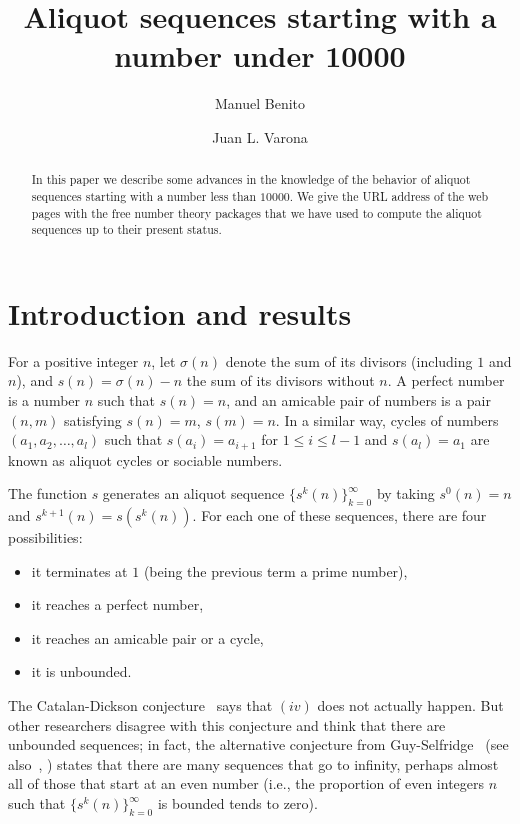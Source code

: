 \documentclass[11pt,twoside]{article}   %
\title{Aliquot sequences starting with a number under 10000}
\author{
Manuel Benito
\and 
Juan L. Varona
}
\date{}
\theoremstyle{plain}
\theoremstyle{definition}
\theoremstyle{remark}
\begin{document}
\maketitle 

\begin{abstract}
In this paper we describe some advances in the knowledge of the behavior of
aliquot sequences starting with a number less than $10000$. We give the URL address
of the web pages with the free number theory packages that we have used to compute the
aliquot sequences up to their present status.
\end{abstract}

\section*{Introduction and results}

For a positive integer $n$, let $\sigma(n)$ denote the sum of its divisors
(including $1$ and $n$), and $s(n) = \sigma(n) - n$
the sum of its divisors without $n$.
A perfect number is a number $n$ such that
$s(n) = n$, and an amicable pair of numbers is a pair $(n,m)$ satisfying
$s(n) = m$, $s(m) = n$. In a similar way, cycles of numbers
$(a_1, a_2, \dots, a_l)$ such that $s(a_i) = a_{i+1}$ for $1 \le i \le l-1$
and $s(a_l) = a_1$ are known as aliquot cycles or sociable numbers.

The function $s$ generates an aliquot sequence $\{s^k(n)\}_{k=0}^\infty$ 
by taking $s^0(n) = n$ and $s^{k+1}(n) = s(s^k(n))$. For each one of these sequences,
there are four possibilities:
\begin{itemize}
\setlength{\itemsep}{0pt}
\item[$(i)$] it terminates at $1$ (being the previous term a prime number),
\item[$(ii)$] it reaches a perfect number,
\item[$(iii)$] it reaches an amicable pair or a cycle,
\item[$(iv)$] it is unbounded.
\end{itemize}
The Catalan-Dickson conjecture~\cite{Cat,Dick} says that $(iv)$ does not actually happen.
But other researchers disagree with this conjecture and think that there
are unbounded sequences; in fact, the alternative conjecture from
Guy-Selfridge~\cite{Guy-Sel} (see also~\cite{Guy-Guy}, \cite{Guy}) states that
there are many sequences that go to infinity, perhaps almost all of
those that start at an even number (i.e., the proportion of even integers $n$
such that $\{s^k(n)\}_{k=0}^\infty$ is bounded tends to zero).
\end{document}
